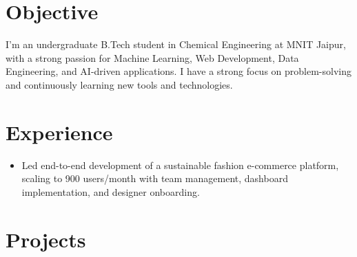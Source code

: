 \documentclass[]{deedy-resume-openfont}
\begin{document}
\begin{minipage}[t]{0.66\textwidth}



\section{Objective}

I'm an undergraduate B.Tech student in Chemical Engineering at MNIT Jaipur, with a strong passion for Machine Learning, Web Development, Data Engineering, and AI-driven applications. I have a strong focus on problem-solving and continuously learning new tools and technologies.





\section{Experience}




\begin{itemize}



   \item Led end-to-end development of a sustainable fashion e-commerce platform, scaling to 900 users/month with team management, dashboard implementation, and designer onboarding.



\end{itemize}

\sectionsep



\section{Projects}






\vspace{\topsep} %

\begin{tightemize}


\end{tightemize}
\end{minipage}
\end{document}
